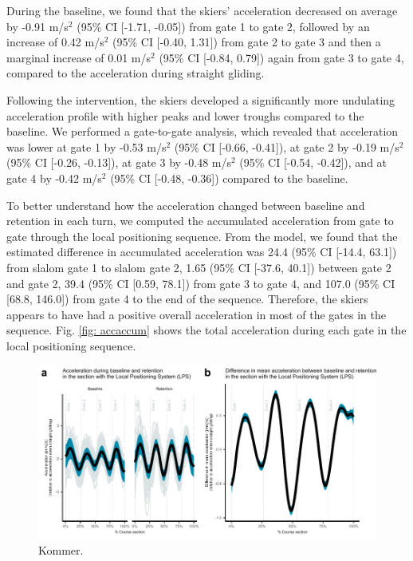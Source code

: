 \documentclass{article}
\begin{document}
During the baseline, we found that the skiers' acceleration decreased on average by -0.91 m/s$^2$ (95\% CI [-1.71, -0.05]) from gate 1 to gate 2, followed by an increase of 0.42 m/s$^2$ (95\% CI [-0.40, 1.31]) from gate 2 to gate 3 and then a marginal increase of 0.01 m/s$^2$ (95\% CI [-0.84, 0.79]) again from gate 3 to gate 4, compared to the acceleration during straight gliding.

Following the intervention, the skiers developed a significantly more undulating acceleration profile with higher peaks and lower troughs compared to the baseline. We performed a gate-to-gate analysis, which revealed that acceleration was lower at gate 1 by -0.53  m/s$^2$ (95\% CI [-0.66, -0.41]), at gate 2 by -0.19  m/s$^2$ (95\% CI [-0.26, -0.13]), at gate 3 by -0.48  m/s$^2$ (95\% CI [-0.54, -0.42]), and at gate 4 by -0.42  m/s$^2$  (95\% CI [-0.48, -0.36]) compared to the baseline. 

To better understand how the acceleration changed between baseline and retention in each turn, we computed the accumulated acceleration from gate to gate through the local positioning sequence. From the model, we found that the estimated difference in accumulated acceleration was 24.4 (95\% CI [-14.4, 63.1]) from slalom gate 1 to slalom gate 2, 1.65 (95\% CI [-37.6, 40.1]) between gate 2 and gate 2, 39.4 (95\% CI [0.59, 78.1]) from gate 3 to gate 4, and 107.0 (95\% CI [68.8, 146.0]) from gate 4 to the end of the sequence. Therefore, the skiers appears to have had a positive overall acceleration in most of the gates in the sequence. Fig. \ref{fig: accaccum} shows the total acceleration during each gate in the local positioning sequence.
\begin{figure}[H]
\centering
\includegraphics{figurer/figure_acc.pdf}
\caption{Kommer.}\label{fig: acc}
\end{figure}
\end{document}
